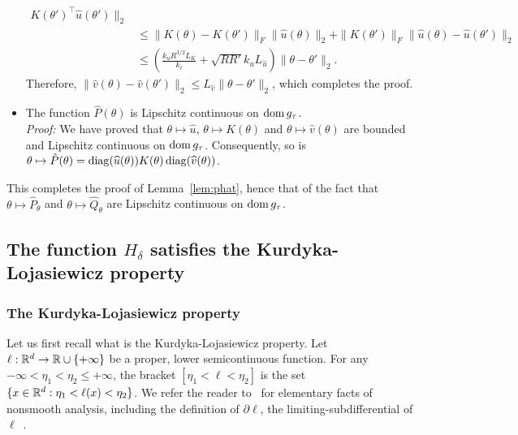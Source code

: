 \begin{itemize}
\begin{align*}
        K(\theta')^{\top} \widehat{u}(\theta')\|_{2}\\ 
      &\leq \|K(\theta) - K(\theta')\|_{F} 
        \|\widehat{u}(\theta)\|_2 + \|K(\theta')\|_{F} 
        \|\widehat{u}(\theta) - \widehat{u}(\theta')\|_{2}\\ 
      &  \leq   \left(\frac{k_{u}R^{3/2}L_{K}}{k_{\ell}}  +   \sqrt{RR'}  k_{u}
        L_{\hat{u}}\right) \|\theta -\theta'\|_2.  
 \end{align*}
 Therefore,
 $\|\widehat{v}(\theta) -  \widehat{v}(\theta')\|_2 \leq  L_{\hat{v}} \|\theta
 -\theta'\|_{2}$, which completes the proof.
\item The function $\hat{P}(\theta)$ is Lipschitz continuous on $\operatorname{dom}
  g_{\tau}$.\\
  \textit{Proof:}   We  have   proved  that   $\theta  \mapsto   \widehat{u}$,
  $\theta  \mapsto K(\theta)$  and  $\theta  \mapsto \widehat{v}(\theta)$  are
  bounded and  Lipschitz continuous on  $\operatorname{dom} g_{\tau}$.  Consequently,  so is
  $\theta  \mapsto  \hat{P}(\theta)   =  \operatorname{diag}(\widehat{u}(\theta))  K(\theta)
  \operatorname{diag}(\widehat{v}(\theta))$. 
\end{itemize}
This completes the proof of Lemma~\ref{lem:phat},  hence that of the fact that
$\theta \mapsto \widehat{P}_{\theta}$ and $\theta\mapsto \widehat{Q}_{\theta}$
are Lipschitz continuous on $\operatorname{dom} g_{\tau}$.




\subsection{The     function    $H_{\delta}$     satisfies    the
  Kurdyka-Lojasiewicz property}
\label{subsec:KL}

\subsubsection{The Kurdyka-Lojasiewicz property}
\label{subsubsec:KL}

Let  us   first  recall  what   is  the  Kurdyka-Lojasiewicz   property.   Let
$\ell :  \mathbb{R}^{d} \to \mathbb{R}\cup\{+\infty\}$  be a proper,  lower semicontinuous
function.  For  any $-\infty<\eta_{1}  < \eta_{2}  \leq +\infty$,  the bracket
$[\eta_{1}       <      \ell       <      \eta_2]$       is      the       set
$\{x \in  \mathbb{R}^{d} : \eta_{1}  < \ell(x) <  \eta_{2}\}$.  We refer  the reader
to~\cite[Section~2]{attouch2013proximal}  for  elementary facts  of  nonsmooth
analysis,    including    the    definition   of    $\partial    \ell$,    the
limiting-subdifferential of $\ell$~\cite{RockWets98}.

